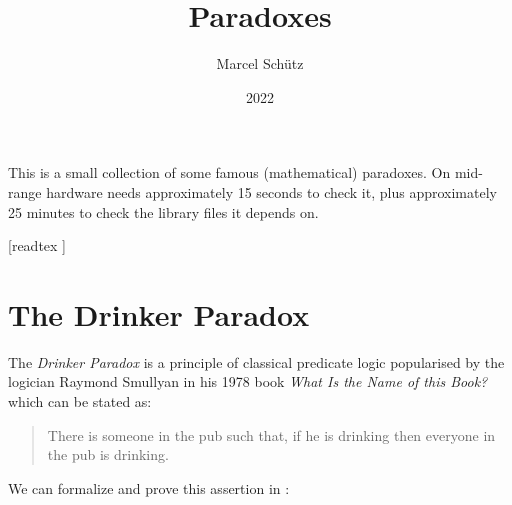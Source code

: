 \documentclass{article}
\title{Paradoxes}
\author{Marcel Schütz}
\date{2022}
\begin{document}
  \maketitle

  \noindent This is a small collection of some famous (mathematical) paradoxes.
  On mid-range hardware \Naproche needs approximately 15 seconds to check it,
  plus approximately 25 minutes to check the library files it depends on.

  \begin{forthel}

    [readtex ]
  \end{forthel}


  \section*{The Drinker Paradox}

  The \emph{Drinker Paradox} is a principle of classical predicate logic
  popularised by the logician Raymond Smullyan in his 1978 book \textit{What Is
  the Name of this Book?} which can be stated as:

  \begin{quotation}
    \noindent There is someone in the pub such that, if he is drinking then
    everyone in the pub is drinking.
  \end{quotation}

  \noindent We can formalize and prove this assertion in \Naproche:
\end{document}
